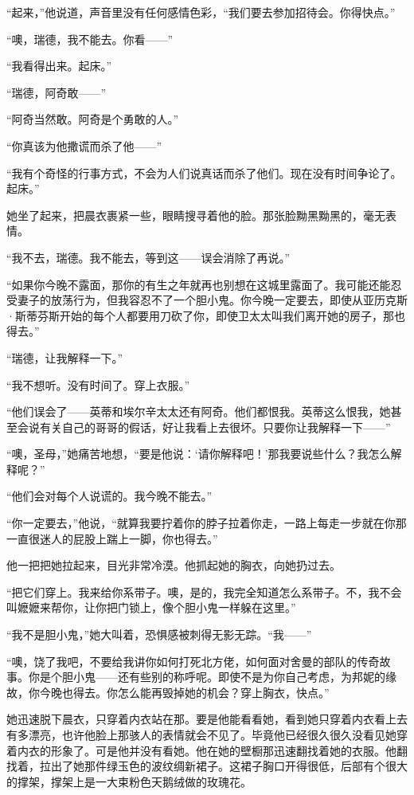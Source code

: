\par “起来，”他说道，声音里没有任何感情色彩，“我们要去参加招待会。你得快点。”
\par “噢，瑞德，我不能去。你看——”
\par “我看得出来。起床。”
\par “瑞德，阿奇敢——”
\par “阿奇当然敢。阿奇是个勇敢的人。”
\par “你真该为他撒谎而杀了他——”
\par “我有个奇怪的行事方式，不会为人们说真话而杀了他们。现在没有时间争论了。起床。”
\par 她坐了起来，把晨衣裹紧一些，眼睛搜寻着他的脸。那张脸黝黑黝黑的，毫无表情。
\par “我不去，瑞德。我不能去，等到这——误会消除了再说。”
\par “如果你今晚不露面，那你的有生之年就再也别想在这城里露面了。我可能还能忍受妻子的放荡行为，但我容忍不了一个胆小鬼。你今晚一定要去，即使从亚历克斯·斯蒂芬斯开始的每个人都要用刀砍了你，即使卫太太叫我们离开她的房子，那也得去。”
\par “瑞德，让我解释一下。”
\par “我不想听。没有时间了。穿上衣服。”
\par “他们误会了——英蒂和埃尔辛太太还有阿奇。他们都恨我。英蒂这么恨我，她甚至会说有关自己的哥哥的假话，好让我看上去很坏。只要你让我解释一下——”
\par “噢，圣母，”她痛苦地想，“要是他说：‘请你解释吧！’那我要说些什么？我怎么解释呢？”
\par “他们会对每个人说谎的。我今晚不能去。”
\par “你一定要去，”他说，“就算我要拧着你的脖子拉着你走，一路上每走一步就在你那一直很迷人的屁股上踹上一脚，你也得去。”
\par 他一把把她拉起来，目光非常冷漠。他抓起她的胸衣，向她扔过去。
\par “把它们穿上。我来给你系带子。噢，是的，我完全知道怎么系带子。不，我不会叫嬷嬷来帮你，让你把门锁上，像个胆小鬼一样躲在这里。”
\par “我不是胆小鬼，”她大叫着，恐惧感被刺得无影无踪。“我——”
\par “噢，饶了我吧，不要给我讲你如何打死北方佬，如何面对舍曼的部队的传奇故事。你是个胆小鬼——还有些别的称呼呢。即使不是为你自己考虑，为邦妮的缘故，你今晚也得去。你怎么能再毁掉她的机会？穿上胸衣，快点。”
\par 她迅速脱下晨衣，只穿着内衣站在那。要是他能看看她，看到她只穿着内衣看上去有多漂亮，也许他脸上那骇人的表情就会不见了。毕竟他已经很久很久没看见她穿着内衣的形象了。可是他并没有看她。他在她的壁橱那迅速翻找着她的衣服。他翻找着，拉出了她那件绿玉色的波纹绸新裙子。这裙子胸口开得很低，后部有个很大的撑架，撑架上是一大束粉色天鹅绒做的玫瑰花。
